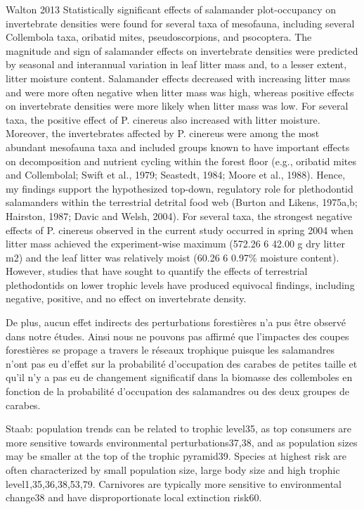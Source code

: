 Walton 2013
Statistically significant effects of salamander plot-occupancy on invertebrate densities were found for several taxa of mesofauna, including several Collembola taxa, oribatid mites, pseudoscorpions, and psocoptera.
The magnitude and sign of salamander effects on invertebrate densities were predicted by seasonal and interannual variation in leaf litter mass and, to a lesser extent, litter moisture content.
Salamander effects decreased with increasing litter mass and were more often negative when litter mass was high,
whereas positive effects on invertebrate densities were more likely when litter mass was low.
For several taxa, the positive effect of P. cinereus also increased with litter moisture.
Moreover, the invertebrates affected by P. cinereus were among the most abundant mesofauna taxa and included groups known to have important effects on decomposition and nutrient cycling within the forest floor (e.g., oribatid mites and Collembolal; Swift et al., 1979; Seastedt, 1984; Moore et al., 1988).
Hence, my findings support the hypothesized top-down, regulatory role for plethodontid salamanders within the terrestrial detrital food web (Burton and Likens, 1975a,b; Hairston, 1987; Davic and Welsh, 2004).
For several taxa, the strongest negative effects of P. cinereus observed in the current study occurred in spring 2004 when litter mass achieved the experiment-wise maximum  (572.26 6 42.00 g dry litter  m2) and the leaf litter was relatively moist (60.26 6 0.97\% moisture content).
However, studies that have sought to quantify the effects of terrestrial plethodontids on lower trophic levels have produced equivocal findings, including negative, positive, and no effect on invertebrate density.



De plus, aucun effet indirects des perturbations forestières n'a pus être observé dans notre études.
Ainsi nous ne pouvons pas affirmé que l'impactes des coupes forestières se propage a travers le réseaux trophique puisque les salamandres 
n'ont pas eu d'effet sur la probabilité d'occupation des carabes de petites taille et qu'il n'y a pas eu de changement significatif 
dans la biomasse des collemboles en fonction de la probabilité d'occupation des salamandres ou des deux groupes de carabes. 


Staab:
population trends can be related to trophic level35, as top consumers are more sensitive towards environmental perturbations37,38, and as population sizes may be smaller at the top of the trophic pyramid39.
Species at highest risk are often characterized by small population size, large body size and high trophic level1,35,36,38,53,79.
Carnivores are typically more sensitive to environmental change38 and have  disproportionate local extinction risk60.


